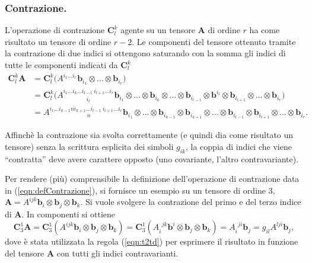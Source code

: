  \subsubsection{Contrazione.} L'operazione di contrazione $\bm{C}^k_l$ agente su un tensore $\bm{A}$ di ordine $r$ ha come risultato un tensore di ordine $r-2$. Le componenti del tensore ottenuto tramite la contrazione di due indici si ottengono saturando con la somma gli indici di tutte le componenti indicati da $\bm{C}^k_l$
\begin{equation}\label{eqn:defContrazione}
\begin{aligned}
 \bm{C}^k_l \bm{A} & =
 \bm{C}^k_l \big(A^{i_1 \dots i_r} \bm{b}_{i_1} \otimes \dots \otimes \bm{b}_{i_r}\big) \\
 & = \bm{C}^k_l \big(A^{i_1 \dots i_k \dots i_{l-1} \ i_{l+1} \dots i_r}_{\qquad \quad \quad i_l} \bm{b}_{i_1} \otimes \dots \otimes \bm{b}_{i_k} \otimes \dots \otimes \bm{b}_{i_{l-1}} \otimes  \bm{b}^{i_l} \otimes \bm{b}_{i_{l+1}} \otimes \dots \otimes \bm{b}_{i_r}\big) \\
 & = A^{i_1 \dots i_{k-1} n i_{k+1} \dots i_{l-1} \ i_{l+1} \dots i_r}_{\qquad \qquad \quad \quad \ \ n} \bm{b}_{i_1} \otimes \dots \otimes \bm{b}_{i_{k-1}} \otimes \bm{b}_{i_{k+1}} \otimes \dots \otimes \bm{b}_{i_{l-1}} \otimes \bm{b}_{i_{l+1}} \otimes \dots \otimes \bm{b}_{i_r} .
\end{aligned}
\end{equation}
\begin{remark}
 Affinchè la contrazione sia svolta correttamente (e quindi dia come risultato un tensore) senza la scrittura esplicita dei simboli $g_{ik}$, la coppia di indici che viene ``contratta'' deve avere carattere opposto (uno covariante, l'altro contravariante).
\end{remark}
Per rendere (più) comprensibile la definizione dell'operazione di contrazione data in (\ref{eqn:defContrazione}), si fornisce un esempio su un tensore di ordine 3, $\bm{A} = A^{ijk} \bm{b}_i \otimes \bm{b}_j \otimes \bm{b}_k$.
  Si vuole svolgere la contrazione del primo e del terzo indice di $\bm{A}$. In componenti si ottiene
  \begin{equation}
   \bm{C}^1_3 \bm{A} = \bm{C}^1_3 ( A^{ijk} \bm{b}_i \otimes \bm{b}_j \otimes \bm{b}_k ) =  \bm{C}^1_3 ( A_i^{\ \ jk} \bm{b}^i \otimes \bm{b}_j \otimes \bm{b}_k ) = A_i^{\ \ ji} \bm{b}_j = g_{il} A^{lji} \bm{b}_j ,
  \end{equation}
  dove è stata utilizzata la regola (\ref{eqn:t2td}) per esprimere il risultato in funzione del tensore $\bm{A}$ con tutti gli indici contravarianti.
  
